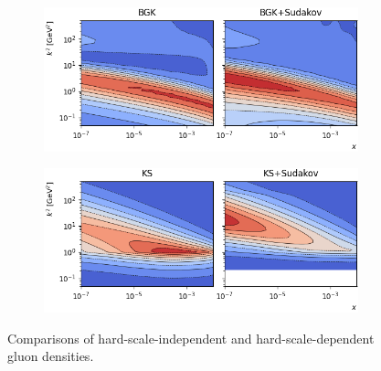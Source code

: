 \documentclass{appolb}
\begin{document}
\begin{figure}[t]
	\centering
	\begin{subfigure}{0.49\textwidth}
		\includegraphics[width=\textwidth]{./BGK-hardscale-175.png}
	\end{subfigure}
	\begin{subfigure}{0.49\textwidth}
		\includegraphics[width=\textwidth]{./KS-hardscale-180.png}
	\end{subfigure}
	\caption{Comparisons of hard-scale-independent and hard-scale-dependent gluon densities. }
	\label{fig:3d}
\end{figure}
\end{document}
